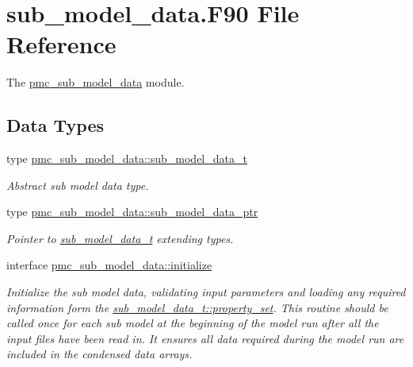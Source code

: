 \hypertarget{sub__model__data_8_f90}{}\section{sub\+\_\+model\+\_\+data.\+F90 File Reference}
\label{sub__model__data_8_f90}


The \mbox{\hyperlink{namespacepmc__sub__model__data}{pmc\+\_\+sub\+\_\+model\+\_\+data}} module.  


\subsection*{Data Types}
\begin{DoxyCompactItemize}
\item 
type \mbox{\hyperlink{structpmc__sub__model__data_1_1sub__model__data__t}{pmc\+\_\+sub\+\_\+model\+\_\+data\+::sub\+\_\+model\+\_\+data\+\_\+t}}
\begin{DoxyCompactList}\small\item\em Abstract sub model data type. \end{DoxyCompactList}\item 
type \mbox{\hyperlink{structpmc__sub__model__data_1_1sub__model__data__ptr}{pmc\+\_\+sub\+\_\+model\+\_\+data\+::sub\+\_\+model\+\_\+data\+\_\+ptr}}
\begin{DoxyCompactList}\small\item\em Pointer to \mbox{\hyperlink{structpmc__sub__model__data_1_1sub__model__data__t}{sub\+\_\+model\+\_\+data\+\_\+t}} extending types. \end{DoxyCompactList}\item 
interface \mbox{\hyperlink{interfacepmc__sub__model__data_1_1initialize}{pmc\+\_\+sub\+\_\+model\+\_\+data\+::initialize}}
\begin{DoxyCompactList}\small\item\em Initialize the sub model data, validating input parameters and loading any required information form the {\ttfamily \mbox{\hyperlink{structpmc__sub__model__data_1_1sub__model__data__t_aeb00155797966fc95e75ad14d45e7242}{sub\+\_\+model\+\_\+data\+\_\+t\+::property\+\_\+set}}}. This routine should be called once for each sub model at the beginning of the model run after all the input files have been read in. It ensures all data required during the model run are included in the condensed data arrays. \end{DoxyCompactList}\end{DoxyCompactItemize}
